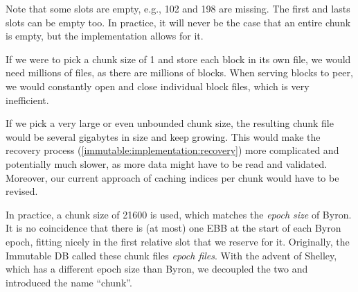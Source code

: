 \begin{center}
\end{center}
Note that some slots are empty, e.g., 102 and 198 are missing. The first and
lasts slots can be empty too. In practice, it will never be the case that an
entire chunk is empty, but the implementation allows for it.

If we were to pick a chunk size of 1 and store each block in its own file, we
would need millions of files, as there are millions of blocks. When serving
blocks to peer, we would constantly open and close individual block files, which
is very inefficient.

If we pick a very large or even unbounded chunk size, the resulting chunk file
would be several gigabytes in size and keep growing. This would make the
recovery process (\cref{immutable:implementation:recovery}) more complicated and
potentially much slower, as more data might have to be read and
validated. Moreover, our current approach of caching
indices per chunk would have to be revised.

In practice, a chunk size of \num{21600} is used, which matches the \emph{epoch
size} of Byron. It is no coincidence that there is (at most) one EBB at the
start of each Byron epoch, fitting nicely in the first relative slot that we
reserve for it. Originally, the Immutable DB called these chunk files
\emph{epoch files}. With the advent of Shelley, which has a different epoch size
than Byron, we decoupled the two and introduced the name ``chunk''.

